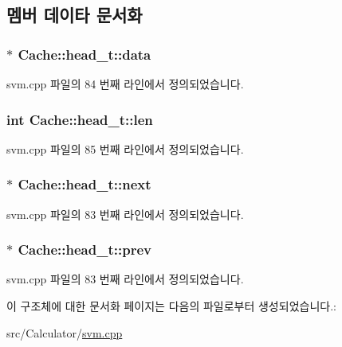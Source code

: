 \subsection{멤버 데이타 문서화}
\hypertarget{struct_cache_1_1head__t_a630b97ea8171e7e8c1f4ff6c3b12c587}{
\subsubsection[{data}]{$\ast$ Cache\+::head\+\_\+t\+::data}}\label{struct_cache_1_1head__t_a630b97ea8171e7e8c1f4ff6c3b12c587}


svm.\+cpp 파일의 84 번째 라인에서 정의되었습니다.

\hypertarget{struct_cache_1_1head__t_af62eb0bc8e61b1889fef2bf7f8a0222b}{
\subsubsection[{len}]{\setlength{\rightskip}{0pt plus 5cm}int Cache\+::head\+\_\+t\+::len}}\label{struct_cache_1_1head__t_af62eb0bc8e61b1889fef2bf7f8a0222b}


svm.\+cpp 파일의 85 번째 라인에서 정의되었습니다.

\hypertarget{struct_cache_1_1head__t_aa152a104ec07250949c234d164f5f3fd}{
\subsubsection[{next}]{ $\ast$ Cache\+::head\+\_\+t\+::next}}\label{struct_cache_1_1head__t_aa152a104ec07250949c234d164f5f3fd}


svm.\+cpp 파일의 83 번째 라인에서 정의되었습니다.

\hypertarget{struct_cache_1_1head__t_a82b1a4d1a105769f85cce8d51c19860e}{
\subsubsection[{prev}]{$\ast$ Cache\+::head\+\_\+t\+::prev}}\label{struct_cache_1_1head__t_a82b1a4d1a105769f85cce8d51c19860e}


svm.\+cpp 파일의 83 번째 라인에서 정의되었습니다.



이 구조체에 대한 문서화 페이지는 다음의 파일로부터 생성되었습니다.\+:\begin{DoxyCompactItemize}
\item 
src/\+Calculator/\hyperlink{svm_8cpp}{svm.\+cpp}\end{DoxyCompactItemize}
